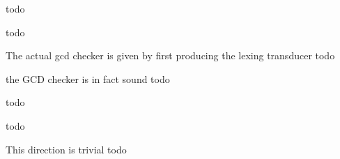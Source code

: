 \begin{definition}[Parser]
    \label{def:Parser}
    todo
\end{definition}

\begin{definition}[PreprocessParser]
    \label{def:PreprocessParser}
    todo
\end{definition}

\begin{definition}[GCDChecker]
    \label{def:GCDChecker}
    The actual gcd checker is given by first producing the lexing transducer
    todo
\end{definition}

\begin{theorem}
    \label{thm:GCDCheckerSound}
    the GCD checker is in fact sound
    todo 
\end{theorem}

\begin{theorem}
    \label{thm:PrefixLanguageGCDCheckerSubsetPrefixLanguage} 
    todo 
\end{theorem}

\begin{theorem}
    \label{thm:LangGrammarSubsetGCDChecker}
    todo 
\end{theorem}

\begin{theorem}
    \label{thm:LangGCDCheckerSubsetGrammar}
    This direction is trivial 
    todo 
\end{theorem}

